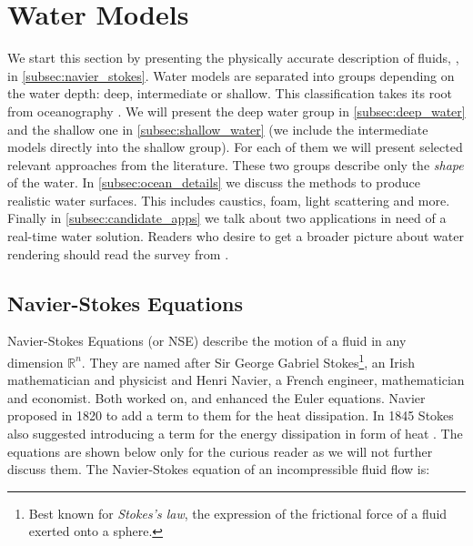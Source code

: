 \section{Water Models}\label{sec:water_models}



We start this section by presenting the physically accurate description of
fluids, , in \autoref{subsec:navier_stokes}. Water
models are separated into groups depending on the water depth: deep,
intermediate or shallow. This classification takes its root from oceanography
\autocite{darles2011survey}. We will present the deep water group in
\autoref{subsec:deep_water} and the shallow one in
\autoref{subsec:shallow_water} (we include the intermediate models directly into
the shallow group). For each of them we will present selected relevant
approaches from the literature. These two groups describe only the
\textit{shape} of the water. In \autoref{subsec:ocean_details} we discuss the
methods to produce realistic water surfaces. This includes caustics, foam, light
scattering and more. Finally in \autoref{subsec:candidate_apps} we talk about
two applications in need of a real-time water solution. Readers who desire to
get a broader picture about water rendering should read the survey from
\citeauthor{darles2011survey} \autocite{darles2011survey}.


\subsection{Navier-Stokes Equations}\label{subsec:navier_stokes}


Navier-Stokes Equations (or NSE) describe the motion of a fluid in any dimension
$\mathbb{R}^n$. They are named after Sir George Gabriel Stokes\footnote{Best
known for \textit{Stokes's law}, the expression of the frictional force of a
fluid exerted onto a sphere.}, an Irish mathematician and physicist and Henri
Navier, a French engineer, mathematician and economist. Both worked on, and
enhanced the Euler equations. Navier proposed in 1820 to add a term to them for
the heat dissipation. In 1845 Stokes also suggested introducing a term for the
energy dissipation in form of heat \autocite{gallagher2010autour}. The equations
are shown below only for the curious reader as we will not further discuss them.
The Navier-Stokes equation of an incompressible fluid flow is:


